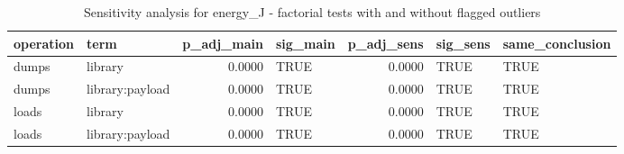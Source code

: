 \begin{table}[ht]
\centering
\begin{tabular}{llrlrll}
  \toprule
operation & term & p\_adj\_main & sig\_main & p\_adj\_sens & sig\_sens & same\_conclusion \\ 
  \midrule
dumps & library & 0.0000 & TRUE & 0.0000 & TRUE & TRUE \\ 
  dumps & library:payload & 0.0000 & TRUE & 0.0000 & TRUE & TRUE \\ 
  loads & library & 0.0000 & TRUE & 0.0000 & TRUE & TRUE \\ 
  loads & library:payload & 0.0000 & TRUE & 0.0000 & TRUE & TRUE \\ 
   \bottomrule
\end{tabular}
\caption{Sensitivity analysis for energy_J - factorial tests with and without flagged outliers} 
\label{tab:sens_RQ1_energy_anova}
\end{table}

